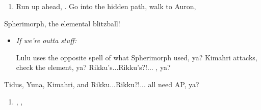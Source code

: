 \begin{enumerate}[resume]
    \item Run up ahead, \sd. Go into the hidden path, walk to Auron, \sd
\end{enumerate}
\begin{battle}[12000]{Spherimorph, the elemental blitzball!}
    \begin{itemize}
        \tidusf Tidus defends, ya?
        \switch{\tidus}{\yuna}
        \yunaf Yuna defends, gotta protect her!
        \kimahrif Kimahri defends, like a good Guardian, ya?
        \switch{\auron}{\rikku}
        \rikkuf Rikku...Rikku?! uses a Grenade, and check what element it is, ya?
        \yunaf Yuna defends, ya?
        \rikkuf Rikku's...Rikku's?!... \od, HP Sphere with:
        \begin{itemize}
            \item Fire? Use Arctic Wind, ya?
            \item Ice? Bomb Core, ya?
            \item Water? Lightning Marble, ya?
            \item Thunder? Fish Scale, ya?
        \end{itemize}
        \item \textit{If we're outta stuff:}
        \begin{itemize}
            \switch{\rikku}{\lulu}
            \luluf Lulu uses the opposite spell of what Spherimorph used, ya?
            \kimahrif Kimahri attacks, check the element, ya?
            \switch{\yuna}{\rikku}
            \rikkuf Rikku's...Rikku's?!... \od, ya?
        \end{itemize}
    \end{itemize}
    Tidus, Yuna, Kimahri, and Rikku...Rikku?!... all need AP, ya?
\end{battle}
\begin{enumerate}[resume]
    \item \cs[1:50], \sd, \sd
\end{enumerate}
